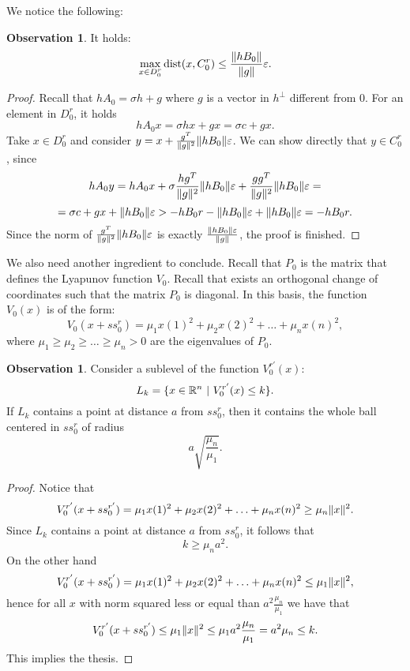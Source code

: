 \documentclass{article}
\theoremstyle{definition}
\newtheorem{obs}[lemma]{Observation}
\DeclarePairedDelimiter{\set}{\{}{\}}
\DeclarePairedDelimiter{\norm}{\lVert }{\rVert}
\newcommand{\R}{\mathbb{R}}
\renewcommand{\epsilon}{\varepsilon}
\DeclareMathOperator{\dist}{dist}
\begin{document}
We notice the following:

\begin{obs}
It holds:
\[ \max_{x \in D_0^{r}} \dist(x,C_0^r) \leq \frac{\norm{h B_0} }{\norm{g}} \epsilon. \]
\end{obs}
\begin{proof}
Recall that $h A_0 = \sigma h + g $ where $g$ is a vector in $h^\perp$ different from 0. For an element in $D_0^{r}$, it holds
\[  h A_0 x =\sigma h x + g x = \sigma c + g x.\]
Take $x \in D_0^{r}$ and consider $y = x + \frac{g^T}{\norm{g}^2}\norm{h B_0} \epsilon $. We can show directly that $y \in C_0^r$, since
\[ h A_0 y = h A_0 x + \sigma \frac{h g^T}{\norm{g}^2}\norm{h B_0} \epsilon +  \frac{g g^T}{\norm{g}^2}\norm{h B_0} \epsilon = \]
\[ = \sigma c + g x + \norm{h B_0} \epsilon > - h B_0 r -  \norm{h B_0} \epsilon +  \norm{h B_0} \epsilon = - h B_0 r. \]
Since the norm of $\frac{g^T}{\norm{g}^2}\norm{h B_0} \epsilon $ is exactly $\frac{\norm{h B_0} \epsilon}{\norm{g}}$, the proof is finished.
\end{proof}

We also need another ingredient to conclude. Recall that $P_0$ is the matrix that defines the Lyapunov function $V_0$. Recall that exists an orthogonal change of coordinates such that the matrix $P_0$ is diagonal. In this basis, the function $V_0(x)$ is of the form:
\[ V_0(x + ss_0^r) = \mu_1 x(1)^2 + \mu_2  x(2)^2 + \ldots + \mu_n x(n)^2, \]
where $\mu_1 \geq  \mu_2  \geq \ldots \geq \mu_n > 0$ are the eigenvalues of $P_0$.
\begin{obs}
Consider a sublevel of the function $V_0^{r'}(x)$:
\[ L_k = \set{x \in \R^n \ | \ V_0^{r'}(x) \leq k}.  \]
If $L_k$ contains a point at distance $a$ from $ss_0^r$, then it contains the whole ball centered in $ss_0^r$ of radius 
\[ a \sqrt{\frac{\mu_n}{\mu_1}}.\]
\end{obs}

\begin{proof}
    Notice that \[ V_0^{r'}(x + ss_0^{r'}) = \mu_1 x(1)^2 + \mu_2  x(2)^2 + \ldots + \mu_n x(n)^2 \geq \mu_n \norm{x}^2.\]
    Since $L_k$ contains a point at distance $a$ from $ss_0^r$, it follows that
    \[ k \geq \mu_n a^2.\]
    On the other hand
    \[ V_0^{r'}(x + ss_0^{r'}) = \mu_1 x(1)^2 + \mu_2  x(2)^2 + \ldots + \mu_n x(n)^2 \leq \mu_1 \norm{x}^2,\]
    hence for all $x$ with norm squared less or equal than $ a^2 \frac{\mu_n}{\mu_1}  $ we have that
    \[ V_0^{r'}(x + ss_0^{r'}) \leq \mu_1 \norm{x}^2 \leq \mu_1 a^2 \frac{\mu_n}{\mu_1} =  a^2  \mu_n \leq k. \]
    This implies the thesis.
\end{proof}
\end{document}
